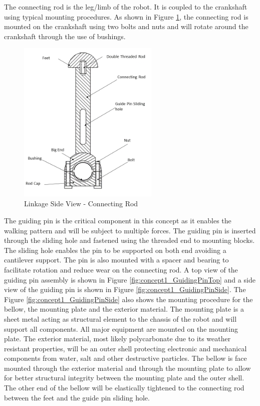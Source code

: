 The connecting rod is the leg/limb of the robot. It is coupled to the crankshaft using typical mounting procedures. As shown in Figure \ref{fig:concept1_ConnectingRod}, the connecting rod is mounted on the crankshaft using two bolts and nuts and will rotate around the crankshaft through the use of bushings. 

\begin{figure}[H]
    \centering
    \includegraphics[width=0.6\textwidth]{img/C1/ConnectingRod.PNG}
    \caption{Linkage Side View - Connecting Rod}
    \label{fig:concept1_ConnectingRod}
\end{figure}

The guiding pin is the critical component in this concept as it enables the walking pattern and will be subject to multiple forces. The guiding pin is inserted through the sliding hole and fastened using the threaded end to mounting blocks. The sliding hole enables the pin to be supported on both end avoiding a cantilever support. The pin is also mounted with a spacer and bearing to facilitate rotation and reduce wear on the connecting rod. A top view of the guiding pin assembly is shown in Figure \ref{fig:concept1_GuidingPinTop} and a side view of the guiding pin is shown in Figure \ref{fig:concept1_GuidingPinSide}. The Figure \ref{fig:concept1_GuidingPinSide} also shows the mounting procedure for the bellow, the mounting plate and the exterior material. The mounting plate is a sheet metal acting as structural element to the chassis of the robot and will support all components. All major equipment are mounted on the mounting plate. The exterior material, most likely polycarbonate due to its weather resistant properties, will be an outer shell protecting electronic and mechanical components from water, salt and other destructive particles. The bellow is face mounted through the exterior material and through the mounting plate to allow for better structural integrity between the mounting plate and the outer shell. The other end of the bellow will be elastically tightened to the connecting rod between the feet and the guide pin sliding hole.  

